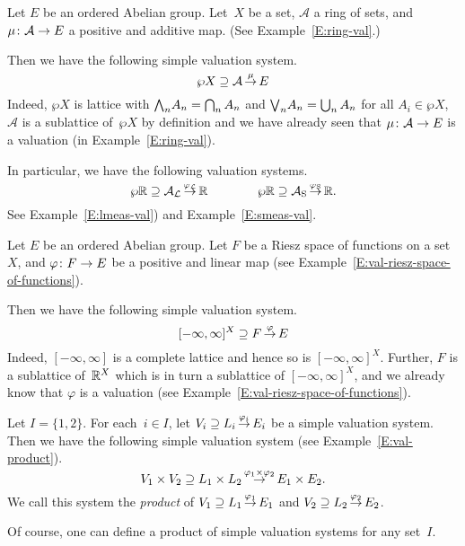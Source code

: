 \documentclass[main.tex]{subfiles}
\begin{document}
%
%
\begin{ex}
\label{E:ring-system}
Let $E$ be an ordered Abelian group.
Let~$X$ be a set, 
$\mathcal{A}$ a ring of sets,
and $\mu\colon \mathcal{A}\rightarrow E$
a positive and additive map.
(See Example~\ref{E:ring-val}.)

Then we have the following simple valuation system.
\begin{equation*}
\wp X \supseteq \mathcal{A}\,\smash{\stackrel{\mu}{\rightarrow}}\,E
\end{equation*}
Indeed, $\wp X$ is lattice with 
$\textstyle{\bigwedge}_n A_n = \bigcap_n A_n$
and $\textstyle{\bigvee}_n A_n = \bigcup_n A_n$ for all $A_i \in \wp X$,
$\mathcal{A}$ is a sublattice of~$\wp X$
by definition
and we have already seen 
that $\mu\colon \mathcal{A}\rightarrow E$ is a valuation
(in Example~\ref{E:ring-val}).

In particular,
we have the following valuation systems.
\begin{equation*}
\wp{\mathbb{R}} \supseteq \mathcal{A}_{\mathcal{L}}\,\smash{\stackrel{\varphi_{\mathcal{L}}}{\rightarrow}}\,\mathbb{R} \qquad\qquad \wp{\mathbb{R}} \supseteq \mathcal{A}_{\mathrm{S}}\,\smash{\stackrel{\varphi_{\mathrm{S}}}{\rightarrow}}\,\mathbb{R}.
\end{equation*}
See Example~\ref{E:lmeas-val}) and  Example~\ref{E:smeas-val}.
\end{ex}

%
%
\begin{ex}
\label{E:riesz-function-space-simple-system}
Let $E$ be an ordered Abelian group.
Let $F$ be a Riesz space of functions on a set~$X$,
and $\varphi\colon F\rightarrow E$ be a positive and linear map
(see Example~\ref{E:val-riesz-space-of-functions}).

Then we have the following simple valuation system.
\begin{equation*}
[-\infty,\infty]^X \supseteq F\,\smash{\stackrel{\varphi}{\rightarrow}}\,E
\end{equation*}
Indeed, $[-\infty,\infty]$ is a complete lattice
and hence so is $[-\infty,\infty]^X$.
Further, $F$ is a sublattice of~$\mathbb{R}^X$
which is in turn a sublattice of $[-\infty,\infty]^X$,
and we already know that
$\varphi$ is a valuation (see Example~\ref{E:val-riesz-space-of-functions}).
\end{ex}

\begin{ex}
Let $I=\{1,2\}$.
For each~$i\in I$,
let $V_i \supseteq L_i\,\smash{\stackrel{\varphi_i}{\rightarrow}}\,E_i$
be a simple valuation system.
Then we have the following simple valuation system
(see Example~\ref{E:val-product}).
\begin{equation*}
V_1\times V_2 \supseteq L_1 \times L_2\,\smash{\stackrel{\varphi_1 \times \varphi_2}{\rightarrow}}\,E_1 \times E_2.
\end{equation*}
We call this system
the \emph{product} of $V_1 \supseteq L_1\,\smash{\stackrel{\varphi_1}{\rightarrow}}\,E_1$
and $V_2 \supseteq L_2\,\smash{\stackrel{\varphi_2}{\rightarrow}}\,E_2$.

Of course,
one can define a product of simple valuation systems
for any set~$I$.
\end{ex}
\end{document}
